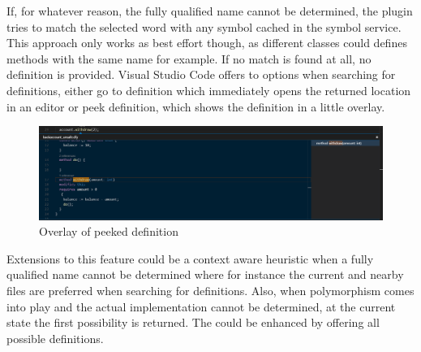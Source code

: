 If, for whatever reason, the fully qualified name cannot be determined, the plugin tries to match the selected word with any symbol cached in the symbol service. This approach only works as best effort though, as different classes could defines methods with the same name for example. If no match is found at all, no definition is provided. \newline
Visual Studio Code offers to options when searching for definitions, either go to definition which immediately opens the returned location in an editor or peek definition, which shows the definition in a little overlay. \newline
 \begin{figure}[H]
	\centering
	\includegraphics[width=1\textwidth]{img/goToDefinitionPeek}
	\caption{Overlay of peeked definition}
	\label{fig:gotodefinitionpeek}
\end{figure}
Extensions to this feature could be a context aware heuristic when a fully qualified name cannot be determined where for instance the current and nearby files are preferred when searching for definitions. Also, when polymorphism comes into play and the actual implementation cannot be determined, at the current state the first possibility is returned. The could be enhanced by offering all possible definitions.


